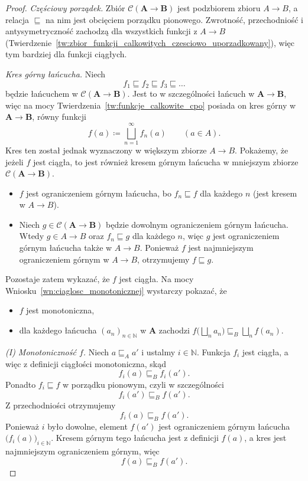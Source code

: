 \documentclass[11pt,a4paper]{article}
\theoremstyle{definition}
\theoremstyle{plain}
\begin{document}
\begin{proof}
	\emph{Częściowy porządek.} Zbiór
	$\mathcal{C}(\boldsymbol{A}\to\boldsymbol{B})$ jest podzbiorem zbioru
	$A\to B$, a relacja $\sqsubseteq$ na nim jest obcięciem porządku
	pionowego. Zwrotność, przechodniość i antysymetryczność zachodzą dla
	wszystkich funkcji z $A\to B$
	(Twierdzenie~\ref{tw:zbior_funkcji_calkowitych_czesciowo_uporzadkowany}),
	więc tym bardziej dla funkcji ciągłych.
	
	\emph{Kres górny łańcucha.} Niech
	\[
	f_1\sqsubseteq f_2\sqsubseteq f_3\sqsubseteq\ldots
	\]
	będzie łańcuchem w $\mathcal{C}(\boldsymbol{A}\to\boldsymbol{B})$.
	Jest to w szczególności łańcuch w $\boldsymbol{A\to B}$, więc na mocy
	Twierdzenia~\ref{tw:funkcje_calkowite_cpo} posiada on kres górny
	w $\boldsymbol{A\to B}$, równy funkcji
	\[
	f(a)\coloneqq\bigsqcup_{n=1}^{\infty}f_n(a)
	\qquad(a\in A).
	\]
	Kres ten został jednak wyznaczony w większym zbiorze $A\to B$.
	Pokażemy, że jeżeli $f$ jest ciągła, to jest również kresem górnym
	łańcucha w mniejszym zbiorze $\mathcal{C}(\boldsymbol{A}\to\boldsymbol{B})$.
	\begin{itemize}
		\item $f$ jest ograniczeniem górnym łańcucha, bo $f_n\sqsubseteq f$
		dla każdego $n$ (jest kresem w $A\to B$).
		\item Niech $g\in\mathcal{C}(\boldsymbol{A}\to\boldsymbol{B})$ będzie
		dowolnym ograniczeniem górnym łańcucha. Wtedy $g\in A\to B$ oraz
		$f_n\sqsubseteq g$ dla każdego $n$, więc $g$ jest ograniczeniem
		górnym łańcucha także w $A\to B$. Ponieważ $f$ jest najmniejszym
		ograniczeniem górnym w $A\to B$, otrzymujemy $f\sqsubseteq g$.
	\end{itemize}
	Pozostaje zatem wykazać, że $f$ jest ciągła. Na mocy
	Wniosku~\ref{wn:ciaglosc_monotonicznej} wystarczy pokazać, że
	\begin{itemize}
		\item[(I)] $f$ jest monotoniczna,
		\item[(II)] dla każdego łańcucha $(a_n)_{n\in\mathbb N}$ w
		$\boldsymbol{A}$ zachodzi
		$f\big(\bigsqcup_{n}a_n\big)\sqsubseteq_B\bigsqcup_{n}f(a_n)$.
	\end{itemize}
	
	\emph{(I) Monotoniczność $f$.} Niech $a\sqsubseteq_A a'$ i ustalmy
	$i\in\mathbb N$. Funkcja $f_i$ jest ciągła, a więc z definicji
	ciągłości monotoniczna, skąd
	\[
	f_i(a)\sqsubseteq_B f_i(a').
	\]
	Ponadto $f_i\sqsubseteq f$ w porządku pionowym, czyli w szczególności
	\[
	f_i(a')\sqsubseteq_B f(a').
	\]
	Z przechodniości otrzymujemy
	\[
	f_i(a)\sqsubseteq_B f(a').
	\]
	Ponieważ $i$ było dowolne, element $f(a')$ jest ograniczeniem górnym
	łańcucha $\big(f_i(a)\big)_{i\in\mathbb N}$. Kresem górnym tego
	łańcucha jest z definicji $f(a)$, a kres jest najmniejszym
	ograniczeniem górnym, więc
	\[
	f(a)\sqsubseteq_B f(a').
	\]
	

\end{proof}
\end{document}
